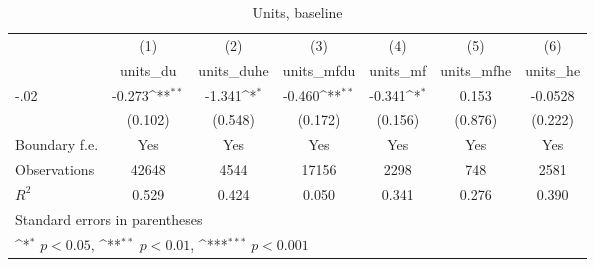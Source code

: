 \begin{table}[htbp]\centering
\def\sym#1{\ifmmode^{#1}\else\(^{#1}\)\fi}
\caption{Units, baseline}
\begin{tabular}{l*{6}{c}}
\hline\hline
                    &\multicolumn{1}{c}{(1)}&\multicolumn{1}{c}{(2)}&\multicolumn{1}{c}{(3)}&\multicolumn{1}{c}{(4)}&\multicolumn{1}{c}{(5)}&\multicolumn{1}{c}{(6)}\\
                    &\multicolumn{1}{c}{units\_du}&\multicolumn{1}{c}{units\_duhe}&\multicolumn{1}{c}{units\_mfdu}&\multicolumn{1}{c}{units\_mf}&\multicolumn{1}{c}{units\_mfhe}&\multicolumn{1}{c}{units\_he}\\
\hline
-.02                &      -0.273\sym{**} &      -1.341\sym{*}  &      -0.460\sym{**} &      -0.341\sym{*}  &       0.153         &     -0.0528         \\
                    &     (0.102)         &     (0.548)         &     (0.172)         &     (0.156)         &     (0.876)         &     (0.222)         \\
[1em]
Boundary f.e.       &         Yes         &         Yes         &         Yes         &         Yes         &         Yes         &         Yes         \\
\hline
Observations        &       42648         &        4544         &       17156         &        2298         &         748         &        2581         \\
\(R^{2}\)           &       0.529         &       0.424         &       0.050         &       0.341         &       0.276         &       0.390         \\
\hline\hline
\multicolumn{7}{l}{\footnotesize Standard errors in parentheses}\\
\multicolumn{7}{l}{\footnotesize \sym{*} \(p<0.05\), \sym{**} \(p<0.01\), \sym{***} \(p<0.001\)}\\
\end{tabular}
\end{table}
